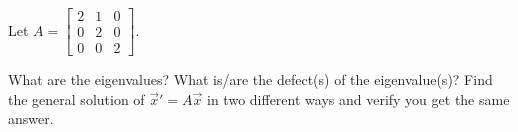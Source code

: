 \documentclass{ximera}
\begin{document}
\begin{exercise}
    Let
    $A = 
    \left[ 
        \begin{smallmatrix} 
            2 & 1 & 0 \\ 
            0 & 2 & 0 \\ 
            0 & 0 & 2 
        \end{smallmatrix} 
    \right]$.
    \begin{tasks}
        \task What are the eigenvalues?
        \task What is/are the defect(s) of the eigenvalue(s)?
        \task Find the general solution of ${\vec{x}}' = A \vec{x}$ in two different ways and verify you get the same answer.
    \end{tasks}
\end{exercise}
\end{document}
